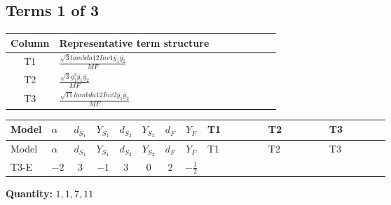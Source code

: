 \documentclass[8pt]{article}
\begin{document}
\begin{landscape}
\subsection*{Terms 1 of 3}
\begin{center}
\begin{tabular}{@{}c >{\raggedright\arraybackslash}p{0.82\linewidth}@{}}
\toprule
Column & Representative term structure \\
\midrule
T1 & \(\displaystyle \frac{\sqrt{3} lambda12Inv1 \overline{y_{1}} \overline{y_{2}}}{MF}\) \\
\midrule
T2 & \(\displaystyle \frac{\sqrt{3} g_{1}^{2} \overline{y_{1}} \overline{y_{2}}}{MF}\) \\
\midrule
T3 & \(\displaystyle \frac{\sqrt{11} lambda12Inv2 \overline{y_{1}} \overline{y_{2}}}{MF}\) \\
\midrule
\bottomrule
\end{tabular}
\end{center}
\smallskip
\tiny
\begin{longtable}{@{}llcccccc >{\raggedright\arraybackslash}p{0.21\linewidth} >{\raggedright\arraybackslash}p{0.21\linewidth} >{\raggedright\arraybackslash}p{0.21\linewidth}@{}}
\toprule
Model & $\alpha$ & $d_{S_1}$ & $Y_{S_1}$ & $d_{S_2}$ & $Y_{S_2}$ & $d_F$ & $Y_F$ & T1 & T2 & T3 \\
\midrule
\endfirsthead
\toprule
Model & $\alpha$ & $d_{S_1}$ & $Y_{S_1}$ & $d_{S_2}$ & $Y_{S_2}$ & $d_F$ & $Y_F$ & T1 & T2 & T3 \\
\midrule
\endhead
T3-E & $-2$ & $3$ & $-1$ & $3$ & $0$ & $2$ & $-\frac{1}{2}$ & \scriptsize\adjustbox{max width=\linewidth}{$\begin{gathered} - \frac{\sqrt{3} lambda12Inv1 \overline{y_{1}} \overline{y_{2}}}{6 MF}\end{gathered}$} & \scriptsize\adjustbox{max width=\linewidth}{$\begin{gathered} \frac{\sqrt{3} g_{1}^{2} \overline{y_{1}} \overline{y_{2}}}{8 MF}\end{gathered}$} & \scriptsize\adjustbox{max width=\linewidth}{$\begin{gathered} \frac{3 \sqrt{11} lambda12Inv2 \overline{y_{1}} \overline{y_{2}}}{22 MF}\end{gathered}$} \\
\midrule
\bottomrule
\end{longtable}
\clearpage
\noindent\textbf{Quantity: }$\mathrm{1,1,7,11}$\par\smallskip

\end{landscape}
\end{document}
